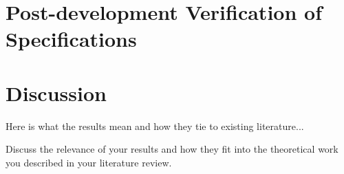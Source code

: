 \section{Post-development Verification of Specifications}

\section{Discussion}

Here is what the results mean and how they tie to existing literature...

Discuss the relevance of your results and how they fit into the theoretical work you described in your
literature review.